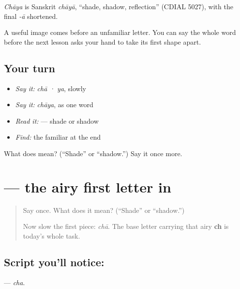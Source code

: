 \begin{cousinweb}
\emph{Chāya} is Sanskrit \emph{chāyā}, \textquotedblleft{}shade, shadow, reflection\textquotedblright{} (CDIAL 5027), with the final \emph{-ā} shortened.
\end{cousinweb}

\begin{grammarlens}[title={What you've built}]
A useful image comes before an unfamiliar letter. You can say the whole word before the next lesson asks your hand to take its first shape apart.
\end{grammarlens}

\subsection*{Your turn}
\begin{itemize}
\raggedright
  \item \emph{Say it:} \emph{chā · ya}, slowly
  \item \emph{Say it:} \emph{chāya}, as one word
  \item \emph{Read it:} \textbf{} — shade or shadow
  \item \emph{Find:} the familiar \textbf{} at the end
\end{itemize}

\begin{tcolorbox}[breakable,colback=teal!4,colframe=teal!35!black,title={Before you move on}]
What does \textbf{} mean? (\textquotedblleft{}Shade\textquotedblright{} or \textquotedblleft{}shadow.\textquotedblright{}) Say it once more.
\end{tcolorbox}
\section[\texorpdfstring{\te{ఛ} (cha)}{ఛ (cha)}]{ — the airy first letter in }

\label{lesson:TE-S172-letter-chha}



\begin{quote}
Say \textbf{} once. What does it mean? (\textquotedblleft{}Shade\textquotedblright{} or \textquotedblleft{}shadow.\textquotedblright{})

Now slow the first piece: \emph{chā}. The base letter carrying that airy \textbf{ch} is today's whole task.
\end{quote}

\subsection*{Script you'll notice: }
\textbf{} — \emph{cha}.

